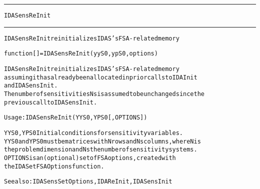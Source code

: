 \begin{samepage}
\hrule
\begin{center}
{\large \verb!IDASensReInit!}
\label{p:IDASensReInit}
\end{center}
\hrule\vspace{0.1in}



\begin{alltt}
IDASensReInit reinitializes IDAS's FSA-related memory
\end{alltt}

\end{samepage}



\begin{samepage}


\begin{alltt}
function [] = IDASensReInit(yyS0,ypS0,options) 
\end{alltt}

\end{samepage}



\begin{alltt}
IDASensReInit reinitializes IDAS's FSA-related memory
   assuming it has already been allocated in prior calls to IDAInit
   and IDASensInit.
   The number of sensitivities Ns is assumed to be unchanged since the 
   previous call to IDASensInit.

   Usage: IDASensReInit ( YYS0, YPS0 [, OPTIONS ] ) 

   YYS0, YPS0   Initial conditions for sensitivity variables.
            YYS0 and YPS0 must be matrices with N rows and Ns columns, where N is 
            the problem dimension and Ns the number of sensitivity systems.
   OPTIONS  is an (optional) set of FSA options, created with
            the IDASetFSAOptions function. 

   See also: IDASensSetOptions, IDAReInit, IDASensInit
\end{alltt}






\vspace{0.1in}